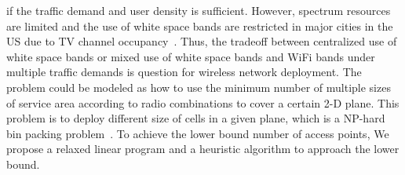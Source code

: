 if the traffic demand and user density is sufficient. 
However, spectrum resources are limited and the use of white space bands are restricted in major 
cities in the US due to TV channel occupancy~\cite{msdatabase}. 
Thus, the tradeoff between centralized use of  white space bands or mixed use of white space
bands and WiFi bands under multiple traffic demands is question for wireless network deployment. 
The problem could be modeled as how to use the minimum number of multiple sizes of service area according to 
radio combinations to cover a certain 2-D plane. This problem is to deploy different size of cells in 
a given plane, which is a NP-hard bin packing problem~\cite{martello1998exact}. 
To achieve the lower bound number of access points, We propose a relaxed linear program and a 
heuristic algorithm to approach the lower bound.



